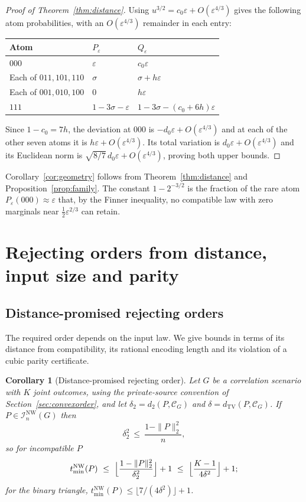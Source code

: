\documentclass[11pt]{article}
\theoremstyle{plain}
\newtheorem{corollary}[theorem]{Corollary}
\theoremstyle{definition}
\DeclareMathOperator{\TV}{TV}
\newcommand{\INW}{\mathcal I^{\mathrm{NW}}}
\newcommand{\eps}{\varepsilon}
\newcommand{\tmin}{t_{\min}}
\begin{document}
\begin{proof}[Proof of Theorem~\ref{thm:distance}]
Using $u^{3/2}=c_0\eps+O(\eps^{4/3})$ gives the following atom probabilities, with an $O(\eps^{4/3})$ remainder in each entry:
\begin{center}
\begin{tabular}{@{}lll@{}}
\toprule
Atom & $P_\eps$ & $Q_\eps$ \\
\midrule
$000$ & $\eps$ & $c_0\eps$ \\
Each of $011,101,110$ & $\sigma$ & $\sigma+h\eps$ \\
Each of $001,010,100$ & $0$ & $h\eps$ \\
$111$ & $1-3\sigma-\eps$ & $1-3\sigma-(c_0+6h)\eps$ \\
\bottomrule
\end{tabular}
\end{center}
Since $1-c_0=7h$, the deviation at $000$ is $-d_0\eps+O(\eps^{4/3})$ and at each of the other seven atoms it is $h\eps+O(\eps^{4/3})$. Its total variation is $d_0\eps+O(\eps^{4/3})$ and its Euclidean norm is $\sqrt{8/7}\,d_0\eps+O(\eps^{4/3})$, proving both upper bounds.
\end{proof}

Corollary~\ref{cor:geometry} follows from Theorem~\ref{thm:distance} and Proposition~\ref{prop:family}. The constant $1-2^{-3/2}$ is the fraction of the rare atom $P_\eps(000)\approx\eps$ that, by the Finner inequality, no compatible law with zero marginals near $\tfrac12\eps^{2/3}$ can retain.


\section{Rejecting orders from distance, input size and parity}\label{sec:input}

\subsection{Distance-promised rejecting orders}\label{sec:general}

The required order depends on the input law. We give bounds in terms of its distance from compatibility, its rational encoding length and its violation of a cubic parity certificate.

\begin{corollary}[Distance-promised rejecting order]\label{prop:promised}
Let $G$ be a correlation scenario with $K$ joint outcomes, using the private-source convention of Section~\ref{sec:convexorder}, and let $\delta_2=d_2(P,\mathcal C_G)$ and $\delta=d_{\TV}(P,\mathcal C_G)$. If $P\in\INW_n(G)$ then
\begin{equation}\label{eq:nw-rate}
\delta_2^2\ \le\ \frac{1-\|P\|_2^2}{n},
\end{equation}
so for incompatible $P$
\[
\tmin^{\mathrm{NW}}(P)\ \le\ \Bigl\lfloor\frac{1-\|P\|_2^2}{\delta_2^2}\Bigr\rfloor+1\ \le\ \Bigl\lfloor\frac{K-1}{4\delta^2}\Bigr\rfloor+1 ;
\]
for the binary triangle, $\tmin^{\mathrm{NW}}(P)\le\lfloor7/(4\delta^2)\rfloor+1$.
\end{corollary}
\end{document}
